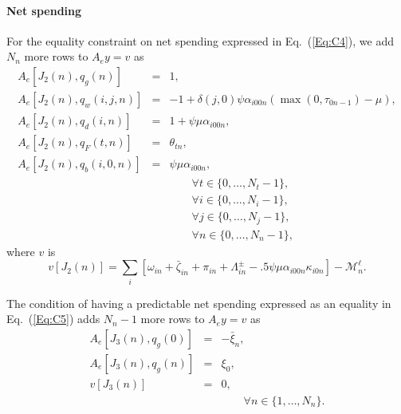 \documentclass{report}[fleqn,12pt]
\begin{document}
\paragraph*{Net spending}
For the equality constraint on net spending expressed in Eq.~(\ref{Eq:C4}),
we add $N_n$ more rows to $A_ey = v$ as
\begin{eqnarray}
	A_e[J_2(n), q_g(n)] &=& 1, \nonumber \\
	A_e[J_2(n), q_w(i, j ,n)] &=& -1 + \delta(j, 0)\psi\alpha_{i00n}(\max(0, \tau_{0n-1}) - \mu), \nonumber \\
	A_e[J_2(n), q_d(i, n)] &=& 1 + \psi\mu\alpha_{i00n}, \nonumber \\
	A_e[J_2(n), q_F(t, n)] &=& \theta_{t n}, \nonumber \\
	A_e[J_2(n), q_b(i, 0, n)] &=& \psi\mu\alpha_{i00n}, \nonumber \\
	&&\qquad\forall t \in \{0,\ldots, N_t-1\},\nonumber\\
	&&\qquad\forall i \in \{0,\ldots, N_i-1\},\nonumber\\
	&&\qquad\forall j \in \{0,\ldots, N_j-1\},\nonumber\\
	&&\qquad\forall n \in \{0,\ldots, N_n-1\}, \nonumber
\end{eqnarray}
where $v$ is
\begin{equation}
	v[J_2(n)] = \sum_i [\omega_{in} + \bar\zeta_{in} + \pi_{in}
	+ \Lambda^\pm_{in} - .5\psi\mu\alpha_{i00n}\kappa_{i0n}] - \mathcal{M}_n^\ell.
\end{equation}

The condition of having a predictable net spending expressed as an
equality in Eq.~(\ref{Eq:C5}) adds $N_n-1$ more rows to $A_ey = v$ as
\begin{eqnarray}
	A_e[J_3(n), q_g(0)] &=& -\bar{\xi}_n, \nonumber \\
	A_e[J_3(n), q_g(n)] &=& \xi_0, \nonumber \\
	v[J_3(n)] &=& 0, \\
	&&\qquad\forall n \in \{1,\ldots, N_n\}. \nonumber
\end{eqnarray}
\end{document}
